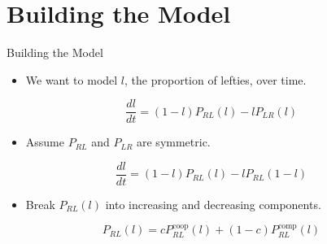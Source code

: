 \documentclass{beamer}
\begin{document}

\section{Building the Model}


    \begin{frame}{Building the Model}
    \begin{itemize}
      \item We want to model $l$, the proportion of lefties, over time.
    \end{itemize}
    \[
      \frac{dl}{dt} = (1-l)P_{RL}(l) - lP_{LR}(l)
    \]
    \begin{itemize}
      \item Assume $P_{RL}$ and $P_{LR}$ are symmetric.
    \end{itemize}
    \begin{equation}
      \frac{dl}{dt} = (1-l)P_{RL}(l) - lP_{RL}(1-l)
    \end{equation}
    \begin{itemize}
      \item Break $P_{RL}(l)$ into increasing and decreasing components.
    \end{itemize}
    \begin{equation}
      P_{RL}(l) = cP_{RL}^{\textrm{coop}}(l) + (1-c)P_{RL}^{\textrm{comp}}(l)
    \end{equation}
    \end{frame}
\end{document}
